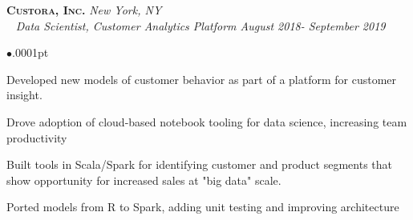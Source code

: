 \documentclass[11pt]{article}
\newcommand{\employer}[4]{
	{\hspace*{-20pt} {\small{\textbf{\textsc{ #1}}}}
  \hfill \small{\emph{#2}}\\ ~\hspace*{-20pt} \small \emph{ #3 \hfill #4}}\\ }
\newenvironment{achievements}{\begin{list}{$\bullet$}{\topsep .0001pt \itemsep -2pt}}{\vspace*{5pt}\end{list} }
\begin{document}
\employer{Custora, Inc.}{New York, NY}{Data Scientist, Customer Analytics Platform}{August 2018- September 2019}
	\begin{achievements}
	\item Developed new models of customer behavior as part of a platform for customer insight.
	\item Drove adoption of cloud-based notebook tooling for data science, increasing team productivity
	\item Built tools in Scala/Spark for identifying customer and product segments that show opportunity for increased sales at "big data" scale.
	\item Ported models from R to Spark, adding unit testing and improving architecture
	\end{achievements}
\end{document}
